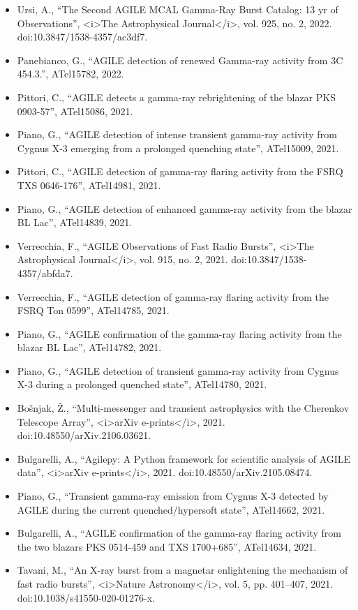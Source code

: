 \begin{itemize}
\item Ursi, A., “The Second AGILE MCAL Gamma-Ray Burst Catalog: 13 yr of Observations”, <i>The Astrophysical Journal</i>, vol. 925, no. 2, 2022. doi:10.3847/1538-4357/ac3df7.
\item Panebianco, G., “AGILE detection of renewed Gamma-ray activity from 3C 454.3.”, ATel15782, 2022.
\item Pittori, C., “AGILE detects a gamma-ray rebrightening of the blazar PKS 0903-57”, ATel15086, 2021.
\item Piano, G., “AGILE detection of intense transient gamma-ray activity from Cygnus X-3 emerging from a prolonged quenching state”, ATel15009, 2021.
\item Pittori, C., “AGILE detection of gamma-ray flaring activity from the FSRQ TXS 0646-176”, ATel14981, 2021.
\item Piano, G., “AGILE detection of enhanced gamma-ray activity from the blazar BL Lac”, ATel14839, 2021.
\item Verrecchia, F., “AGILE Observations of Fast Radio Bursts”, <i>The Astrophysical Journal</i>, vol. 915, no. 2, 2021. doi:10.3847/1538-4357/abfda7.
\item Verrecchia, F., “AGILE detection of gamma-ray flaring activity from the FSRQ Ton 0599”, ATel14785, 2021.
\item Piano, G., “AGILE confirmation of the gamma-ray flaring activity from the blazar BL Lac”, ATel14782, 2021.
\item Piano, G., “AGILE detection of transient gamma-ray activity from Cygnus X-3 during a prolonged quenched state”, ATel14780, 2021.
\item Bošnjak, Ž., “Multi-messenger and transient astrophysics with the Cherenkov Telescope Array”, <i>arXiv e-prints</i>, 2021. doi:10.48550/arXiv.2106.03621.
\item Bulgarelli, A., “Agilepy: A Python framework for scientific analysis of AGILE data”, <i>arXiv e-prints</i>, 2021. doi:10.48550/arXiv.2105.08474.
\item Piano, G., “Transient gamma-ray emission from Cygnus X-3 detected by AGILE during the current quenched/hypersoft state”, ATel14662, 2021.
\item Bulgarelli, A., “AGILE confirmation of the gamma-ray flaring activity from the two blazars PKS 0514-459 and TXS 1700+685”, ATel14634, 2021.
\item Tavani, M., “An X-ray burst from a magnetar enlightening the mechanism of fast radio bursts”, <i>Nature Astronomy</i>, vol. 5, pp. 401–407, 2021. doi:10.1038/s41550-020-01276-x.

\end{itemize}
